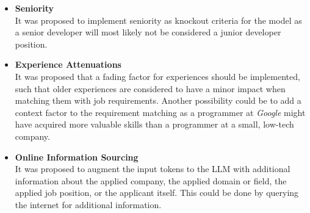 \documentclass[draft,final]{thesisclass} %
\begin{document}
\begin{itemize}
    \item \textbf{Seniority}\\
    It was proposed to implement seniority as knockout criteria for the model as a senior developer will most likely not be considered a junior developer position.
    \item \textbf{Experience Attenuations}\\
    It was proposed that a fading factor for experiences should be implemented, such that older experiences are considered to have a minor impact when matching them with job requirements. Another possibility could be to add a context factor to the requirement matching as a programmer at \textit{Google} might have acquired more valuable skills than a programmer at a small, low-tech company.
    \item \textbf{Online Information Sourcing}\\
    It was proposed to augment the input tokens to the \gls{LLM} with additional information about the applied company, the applied domain or field, the applied job position, or the applicant itself. This could be done by querying the internet for additional information.
\end{itemize}
\end{document}
